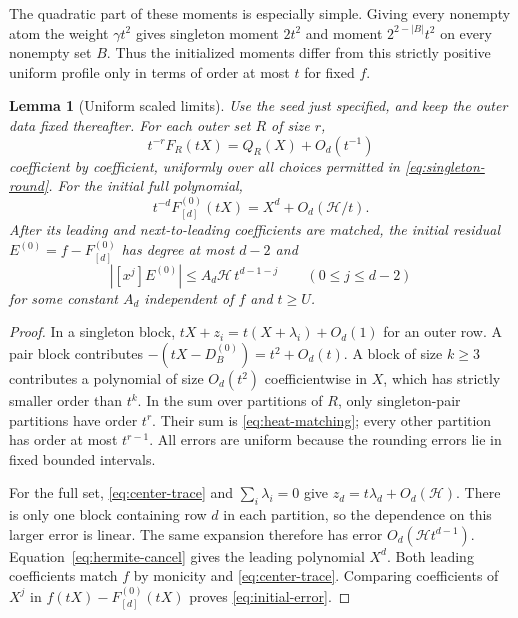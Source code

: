 \documentclass[11pt,a4paper]{article}
\newtheorem{lemma}[theorem]{Lemma}
\theoremstyle{definition}
\newcommand{\htf}{\mathcal H}
\newcommand{\wt}{\gamma}
\begin{document}
The quadratic part of these moments is especially simple. Giving every
nonempty atom the weight $\wt t^2$ gives singleton moment $2t^2$ and
moment $2^{2-|B|}t^2$ on every nonempty set $B$. Thus the initialized
moments differ from this strictly positive uniform profile only in terms
of order at most $t$ for fixed $f$.

\begin{lemma}[Uniform scaled limits]\label{lem:limits}
Use the seed just specified, and keep the outer data fixed thereafter.
For each outer set $R$ of size $r$,
\begin{equation}\label{eq:outer-limit}
 t^{-r}F_R(tX)=Q_R(X)+O_d(t^{-1})
\end{equation}
coefficient by coefficient, uniformly over all choices permitted in
\eqref{eq:singleton-round}. For the initial full polynomial,
\begin{equation}\label{eq:full-limit}
 t^{-d}F_{[d]}^{(0)}(tX)=X^d+O_d(\htf/t).
\end{equation}
After its leading and next-to-leading coefficients are matched, the
initial residual $E^{(0)}=f-F_{[d]}^{(0)}$ has degree at most $d-2$ and
\begin{equation}\label{eq:initial-error}
 |[x^j]E^{(0)}|\le A_d\htf\,t^{d-1-j}
 \qquad(0\le j\le d-2)
\end{equation}
for some constant $A_d$ independent of $f$ and $t\ge U$.
\end{lemma}
\begin{proof}
In a singleton block, $tX+z_i=t(X+\lambda_i)+O_d(1)$ for an
outer row. A pair block contributes
$-(tX-D_B^{(0)})=t^2+O_d(t)$.
A block of size $k\ge3$ contributes a polynomial of size $O_d(t^2)$
coefficientwise in $X$, which has strictly smaller order than $t^k$.
In the sum over partitions of $R$, only singleton-pair partitions have
order $t^r$. Their sum is \eqref{eq:heat-matching}; every other partition
has order at most $t^{r-1}$. All errors are uniform because the rounding
errors lie in fixed bounded intervals.

For the full set, \eqref{eq:center-trace} and
$\sum_i\lambda_i=0$ give
$z_d=t\lambda_d+O_d(\htf)$. There is only one block containing row $d$
in each partition, so the dependence on this larger error is linear.
The same expansion therefore has error $O_d(\htf t^{d-1})$.
Equation~\eqref{eq:hermite-cancel} gives the leading polynomial $X^d$.
Both leading coefficients match $f$ by monicity and
\eqref{eq:center-trace}. Comparing coefficients of $X^j$ in
$f(tX)-F_{[d]}^{(0)}(tX)$ proves \eqref{eq:initial-error}.
\end{proof}
\end{document}
